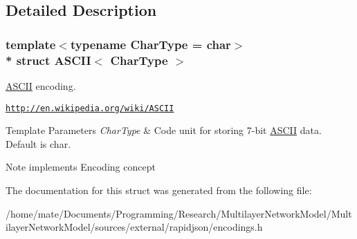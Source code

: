 \subsection{Detailed Description}
\subsubsection*{template$<$typename Char\+Type = char$>$\\*
struct A\+S\+C\+I\+I$<$ Char\+Type $>$}

\hyperlink{structASCII}{A\+S\+C\+II} encoding. 

\href{http://en.wikipedia.org/wiki/ASCII}{\tt http\+://en.\+wikipedia.\+org/wiki/\+A\+S\+C\+II} 
\begin{DoxyTemplParams}{Template Parameters}
{\em Char\+Type} & Code unit for storing 7-\/bit \hyperlink{structASCII}{A\+S\+C\+II} data. Default is char. \\
\hline
\end{DoxyTemplParams}
\begin{DoxyNote}{Note}
implements Encoding concept 
\end{DoxyNote}


The documentation for this struct was generated from the following file\+:\begin{DoxyCompactItemize}
\item 
/home/mate/\+Documents/\+Programming/\+Research/\+Multilayer\+Network\+Model/\+Multilayer\+Network\+Model/sources/external/rapidjson/encodings.\+h\end{DoxyCompactItemize}

